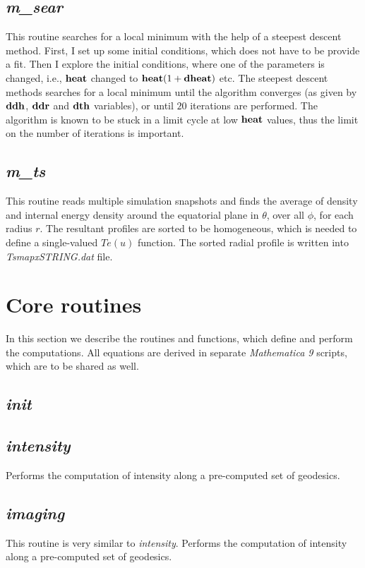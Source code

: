 \documentclass{emulateapj}
\newcommand{\mat}{\textit{Mathematica 9 }}
\begin{document}
\subsection{\textit{m\_sear}}
This routine searches for a local minimum with the help of a steepest descent method.
First, I set up some initial conditions, which does not have to be provide a fit.
Then I explore the initial conditions, where one of the parameters is changed, i.e., ${\bf heat}$ changed to ${\bf heat}(1+{\bf dheat})$
etc. The steepest descent methods searches for a local minimum until the algorithm converges (as given by
${\bf ddh}$, ${\bf ddr}$ and ${\bf dth}$ variables), or until $20$ iterations are performed.
The algorithm is known to be stuck in a limit cycle at low ${\bf heat}$ values, thus the limit on the number of
iterations is important.

\subsection{\textit{m\_ts}}
This routine reads multiple simulation snapshots and finds the average of density and internal energy density
around the equatorial plane in $\theta$, over all $\phi$, for each radius $r$.
The resultant profiles are sorted to be homogeneous, which is needed to define a single-valued $Te(u)$ function.
The sorted radial profile is written into \textit{TsmapxSTRING.dat} file.

\section{Core routines}
In this section we describe the routines and functions, which define and perform the computations.
All equations are derived in separate \mat  scripts, which are to be shared as well.
\subsection{\textit{init}}
\subsection{\textit{intensity}}
Performs the computation of intensity along a pre-computed set of geodesics.
\subsection{\textit{imaging}}
This routine is very similar to \textit{intensity}.
Performs the computation of intensity along a pre-computed set of geodesics.
\end{document}
